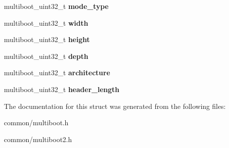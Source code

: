 \begin{DoxyCompactItemize}
\item 
multiboot\+\_\+uint32\+\_\+t {\bfseries mode\+\_\+type}\hypertarget{structmultiboot__header_a4c90b7929342dd5aab7d08afa0906d28}{}\label{structmultiboot__header_a4c90b7929342dd5aab7d08afa0906d28}

\item 
multiboot\+\_\+uint32\+\_\+t {\bfseries width}\hypertarget{structmultiboot__header_ad72a1a3dd608e73c818d0c27974def40}{}\label{structmultiboot__header_ad72a1a3dd608e73c818d0c27974def40}

\item 
multiboot\+\_\+uint32\+\_\+t {\bfseries height}\hypertarget{structmultiboot__header_a055c5e6553ea032897ad50a12f998a17}{}\label{structmultiboot__header_a055c5e6553ea032897ad50a12f998a17}

\item 
multiboot\+\_\+uint32\+\_\+t {\bfseries depth}\hypertarget{structmultiboot__header_aba85b53dc3af1bf99c71292a776e9dff}{}\label{structmultiboot__header_aba85b53dc3af1bf99c71292a776e9dff}

\item 
multiboot\+\_\+uint32\+\_\+t {\bfseries architecture}\hypertarget{structmultiboot__header_a116c9b57307b74f86920e14c9ec89575}{}\label{structmultiboot__header_a116c9b57307b74f86920e14c9ec89575}

\item 
multiboot\+\_\+uint32\+\_\+t {\bfseries header\+\_\+length}\hypertarget{structmultiboot__header_a5356113fb7e9e82c081374a6ab2ae509}{}\label{structmultiboot__header_a5356113fb7e9e82c081374a6ab2ae509}

\end{DoxyCompactItemize}


The documentation for this struct was generated from the following files\+:\begin{DoxyCompactItemize}
\item 
common/multiboot.\+h\item 
common/multiboot2.\+h\end{DoxyCompactItemize}
